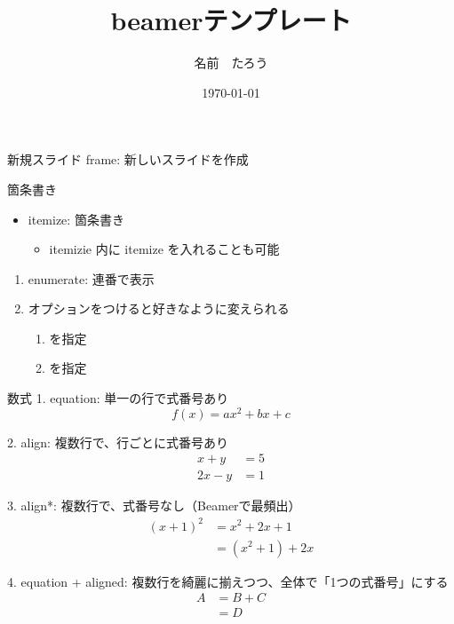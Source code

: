 \documentclass[aspectratio=43,11pt]{beamer}
\title{beamerテンプレート}
\author{名前　たろう}
\date{\today}
\begin{document}
\maketitle

\begin{frame}{新規スライド}
    frame: 新しいスライドを作成
\end{frame}

\begin{frame}{箇条書き}
    \begin{itemize}
        \item itemize: 箇条書き
        \begin{itemize}
            \item itemizie 内に itemize を入れることも可能
            \footnotemark
        \end{itemize}
    \end{itemize}

    \begin{enumerate}
        \item enumerate: 連番で表示
        \item オプションをつけると好きなように変えられる
        \begin{enumerate}
            \item [A] [A]を指定
            \item [(1)] [(1)]を指定
        \end{enumerate}
    \end{enumerate}

\end{frame}

\begin{frame}{数式}
    1. equation: 単一の行で式番号あり
    \begin{equation}
        f(x) = a x^2 + b x + c
    \end{equation}

    2. align: 複数行で、行ごとに式番号あり
    \begin{align}
        x + y &= 5 \\
        2x - y &= 1
    \end{align}

    3. align*: 複数行で、式番号なし（Beamerで最頻出）
    \begin{align*}
        (x+1)^2 &= x^2 + 2x + 1 \\
                &= (x^2 + 1) + 2x
    \end{align*}

    4. equation + aligned: 複数行を綺麗に揃えつつ、全体で「1つの式番号」にする
    \begin{equation}
        \begin{aligned}
            A &= B + C \\
              &= D
        \end{aligned}
    \end{equation}
\end{frame}
\end{document}
